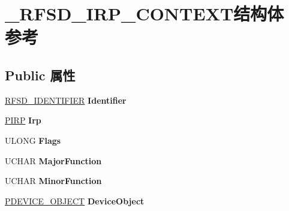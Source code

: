 \hypertarget{struct___r_f_s_d___i_r_p___c_o_n_t_e_x_t}{}\section{\+\_\+\+R\+F\+S\+D\+\_\+\+I\+R\+P\+\_\+\+C\+O\+N\+T\+E\+X\+T结构体 参考}
\label{struct___r_f_s_d___i_r_p___c_o_n_t_e_x_t}
\subsection*{Public 属性}
\begin{DoxyCompactItemize}
\item 
\mbox{\label{struct___r_f_s_d___i_r_p___c_o_n_t_e_x_t_acd7b37b9d17b87b27d18b8aeb54ae2f0}} 
\hyperlink{struct___r_f_s_d___i_d_e_n_t_i_f_i_e_r}{R\+F\+S\+D\+\_\+\+I\+D\+E\+N\+T\+I\+F\+I\+ER} {\bfseries Identifier}
\item 
\mbox{\label{struct___r_f_s_d___i_r_p___c_o_n_t_e_x_t_a7dd922a9a85ebda642f2eb4272c61186}} 
\hyperlink{interfacevoid}{P\+I\+RP} {\bfseries Irp}
\item 
\mbox{\label{struct___r_f_s_d___i_r_p___c_o_n_t_e_x_t_ad539a16203cb6a29f5294c01344dcb2e}} 
U\+L\+O\+NG {\bfseries Flags}
\item 
\mbox{\label{struct___r_f_s_d___i_r_p___c_o_n_t_e_x_t_a26af809ee4270ef3298f49678fe52cdd}} 
U\+C\+H\+AR {\bfseries Major\+Function}
\item 
\mbox{\label{struct___r_f_s_d___i_r_p___c_o_n_t_e_x_t_a327134dd09e6385f8f22a6679536329a}} 
U\+C\+H\+AR {\bfseries Minor\+Function}
\item 
\mbox{\label{struct___r_f_s_d___i_r_p___c_o_n_t_e_x_t_a15cfe11ad3b16b6d09b1826aafb6f183}} 
\hyperlink{struct___d_e_v_i_c_e___o_b_j_e_c_t}{P\+D\+E\+V\+I\+C\+E\+\_\+\+O\+B\+J\+E\+CT} {\bfseries Device\+Object}
\item 
\mbox{\label{struct___r_f_s_d___i_r_p___c_o_n_t_e_x_t_ac5922ca377c10b7e657dcc5317c623e3}} 

\end{DoxyCompactItemize}
